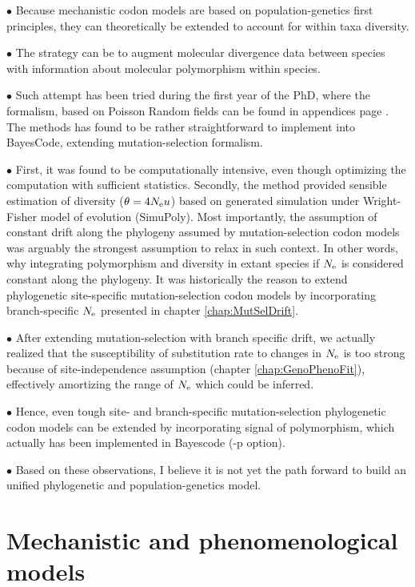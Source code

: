 $\bullet$ Because mechanistic \gls{codon} models are based on population-genetics first principles, they can theoretically be extended to account for within taxa diversity.

$\bullet$ The strategy can be to augment molecular divergence data between species with information about molecular polymorphism within species.

$\bullet$ Such attempt has been tried during the first year of the PhD, where the formalism, based on Poisson Random fields can be found in appendices page \pageref{sec-appendix:PRF}.
The methods has found to be rather straightforward to implement into BayesCode, extending mutation-selection formalism.

$\bullet$ First, it was found to be computationally intensive, even though optimizing the computation with sufficient statistics.
Secondly, the method provided sensible estimation of diversity ($\theta = 4 N_{\textrm{e}} u$) based on generated simulation under Wright-Fisher model of evolution (SimuPoly).
Most importantly, the assumption of constant drift along the phylogeny assumed by mutation-selection \gls{codon} models was arguably the strongest assumption to relax in such context.
In other words, why integrating polymorphism and diversity in extant species if $N_{\textrm{e}}$ is considered constant along the phylogeny.
It was historically the reason to extend phylogenetic site-specific mutation-selection \gls{codon} models by incorporating branch-specific $N_{\textrm{e}}$ presented in chapter \ref{chap:MutSelDrift}.

$\bullet$ After extending mutation-selection with branch specific drift, we actually realized that the susceptibility of \gls{substitution} rate to changes in $N_{\textrm{e}}$ is too strong because of site-independence assumption (chapter \ref{chap:GenoPhenoFit}), effectively amortizing the range of $N_{\textrm{e}}$ which could be inferred.

$\bullet$ Hence, even tough site- and branch-specific mutation-selection phylogenetic \gls{codon} models can be extended by incorporating signal of polymorphism, which actually has been implemented in Bayescode (-p option).

$\bullet$ Based on these observations, I believe it is not yet the path forward to build an unified phylogenetic and population-genetics model.

\section{Mechanistic and phenomenological models}
\label{sec:mechanistic-and-phenomenological-models}

